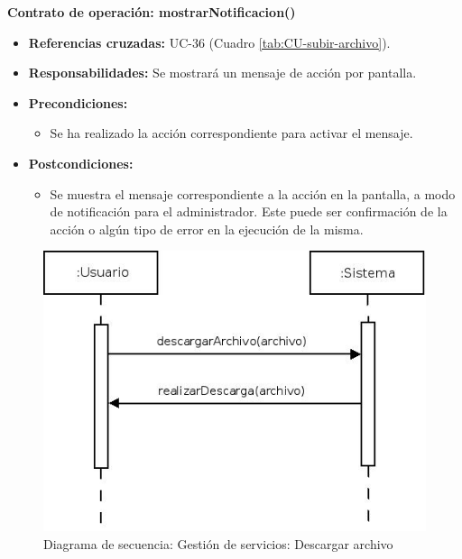 \textbf{Contrato de operación: mostrarNotificacion()}
\begin{itemize}
\item \textbf{Referencias cruzadas:} UC-36 (Cuadro \ref{tab:CU-subir-archivo}).
\item \textbf{Responsabilidades:} Se mostrará un mensaje de acción por pantalla.
\item \textbf{Precondiciones:} 
 \begin{itemize}
\item Se ha realizado la acción correspondiente para activar el mensaje.
\end {itemize}
\item \textbf{Postcondiciones:} 
 \begin{itemize}
\item Se muestra el mensaje correspondiente a la acción en la pantalla, a modo de notificación para el administrador. Este puede ser confirmación de la acción o algún tipo de error en la ejecución de la misma.
\end {itemize}
\end {itemize}


\vspace{10mm}

\begin{figure}[H]
\centering
  \includegraphics[scale=.55]{img/secuencias/gestion-servicios-descargar-archivo.jpeg}
  \caption{Diagrama de secuencia: Gestión de servicios: Descargar archivo}
  \label{fig:secuencia-gestion-servicios-descargar-archivo}
\end{figure}

